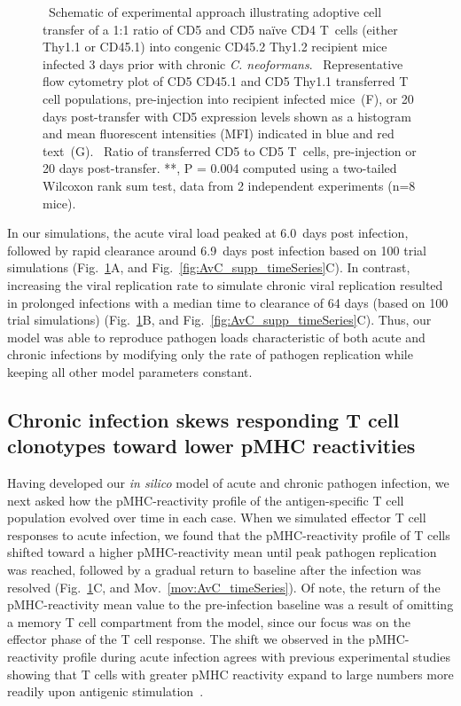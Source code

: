 \begin{figure}[htb!]
{    %
    ~Schematic of experimental approach illustrating adoptive cell transfer of a 1:1 ratio of CD5 and CD5 na\"{i}ve CD4\pos{} T~cells (either Thy1.1\pos{} or CD45.1\pos{}) into congenic CD45.2\pos{} Thy1.2\pos{} recipient mice infected 3 days prior with chronic \textit{C. neoformans}. %
    ~Representative flow cytometry plot of CD5 CD45.1\pos{} and CD5 Thy1.1\pos{} transferred T cell populations, pre-injection into recipient infected mice~(F), or 20 days post-transfer with CD5 expression levels shown as a histogram and mean fluorescent intensities (MFI) indicated in blue and red text~(G). %
    ~Ratio of transferred CD5 to CD5 T~cells, pre-injection or 20 days post-transfer. **, P = 0.004 computed using a two-tailed Wilcoxon rank sum test, data from 2 independent experiments (n=8 mice).}
    \label{fig:AvC_timeSeries}
\end{figure}
%
In our simulations, the acute viral load peaked at 6.0~days post infection, followed by rapid clearance around 6.9~days post infection based on 100 trial simulations (Fig.~\ref{fig:AvC_timeSeries}A, and Fig.~\ref{fig:AvC_supp_timeSeries}C). In contrast, increasing the viral replication rate to simulate chronic viral replication resulted in prolonged infections with a median time to clearance of 64 days (based on 100 trial simulations) (Fig.~\ref{fig:AvC_timeSeries}B, and Fig.~\ref{fig:AvC_supp_timeSeries}C). Thus, our model was able to reproduce pathogen loads characteristic of both acute and chronic infections by modifying only the rate of pathogen replication while keeping all other model parameters constant.

\subsection{Chronic infection skews responding T cell clonotypes toward lower pMHC reactivities}

Having developed our \textit{in silico} model of acute and chronic pathogen infection, we next asked how the pMHC-reactivity profile of the antigen-specific T cell population evolved over time in each case. When we simulated effector T cell responses to acute infection, we found that the pMHC-reactivity profile of T cells shifted toward a higher pMHC-reactivity mean until peak pathogen replication was reached, followed by a gradual return to baseline after the infection was resolved (Fig.~\ref{fig:AvC_timeSeries}C, and Mov.~\ref{mov:AvC_timeSeries}). Of note, the return of the pMHC-reactivity mean value to the pre-infection baseline was a result of omitting a memory T cell compartment from the model, since our focus was on the effector phase of the T cell response. The shift we observed in the pMHC-reactivity profile during acute infection agrees with previous experimental studies showing that T cells with greater pMHC reactivity expand to large numbers more readily upon antigenic stimulation~\cite{busch1999t,king2012t,rosenthal2012low,mandl2013t}.

